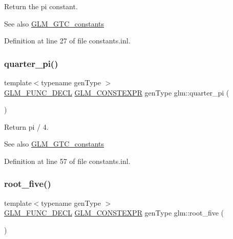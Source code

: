 Return the pi constant. \begin{DoxySeeAlso}{See also}
\mbox{\hyperlink{group__gtc__constants}{G\+L\+M\+\_\+\+G\+T\+C\+\_\+constants}} 
\end{DoxySeeAlso}


Definition at line 27 of file constants.\+inl.

\mbox{\label{group__gtc__constants_ga3c9df42bd73c519a995c43f0f99e77e0}} 
\subsubsection{\texorpdfstring{quarter\_pi()}{quarter\_pi()}}
{\footnotesize\ttfamily template$<$typename gen\+Type $>$ \\
\mbox{\hyperlink{setup_8hpp_ab2d052de21a70539923e9bcbf6e83a51}{G\+L\+M\+\_\+\+F\+U\+N\+C\+\_\+\+D\+E\+CL}} \mbox{\hyperlink{setup_8hpp_a08b807947b47031d3a511f03f89645ad}{G\+L\+M\+\_\+\+C\+O\+N\+S\+T\+E\+X\+PR}} gen\+Type glm\+::quarter\+\_\+pi (\begin{DoxyParamCaption}{ }\end{DoxyParamCaption})}

Return pi / 4. \begin{DoxySeeAlso}{See also}
\mbox{\hyperlink{group__gtc__constants}{G\+L\+M\+\_\+\+G\+T\+C\+\_\+constants}} 
\end{DoxySeeAlso}


Definition at line 57 of file constants.\+inl.

\mbox{\label{group__gtc__constants_gae9ebbded75b53d4faeb1e4ef8b3347a2}} 
\subsubsection{\texorpdfstring{root\_five()}{root\_five()}}
{\footnotesize\ttfamily template$<$typename gen\+Type $>$ \\
\mbox{\hyperlink{setup_8hpp_ab2d052de21a70539923e9bcbf6e83a51}{G\+L\+M\+\_\+\+F\+U\+N\+C\+\_\+\+D\+E\+CL}} \mbox{\hyperlink{setup_8hpp_a08b807947b47031d3a511f03f89645ad}{G\+L\+M\+\_\+\+C\+O\+N\+S\+T\+E\+X\+PR}} gen\+Type glm\+::root\+\_\+five (\begin{DoxyParamCaption}{ }\end{DoxyParamCaption})}


